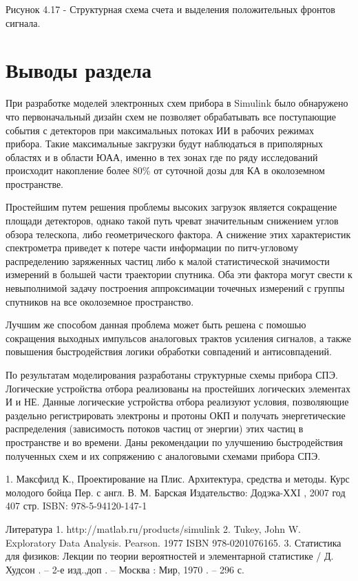 Рисунок 4.17 - Структурная схема счета и выделения положительных фронтов сигнала.


\section{Выводы раздела}
При разработке моделей электронных схем прибора в Simulink было обнаружено что первоначальный дизайн схем не позволяет обрабатывать все поступающие события с детекторов при максимальных потоках ИИ в рабочих режимах прибора. Такие максимальные закгрузки будут наблюдаться в приполярных областях и в области ЮАА, именно в тех зонах где по ряду исследований происходит накопление более 80\% от суточной дозы для КА в околоземном пространстве. 

Простейшим путем решения проблемы высоких загрузок является сокращение площади детекторов, однако такой путь чреват значительным снижением углов обзора телескопа, либо геометрического фактора. А снижение этих характеристик спектрометра приведет к потере части информации по питч-угловому распределению заряженных частиц либо к малой статистической значимости измерений в большей части траектории спутника. Оба эти фактора могут свести к невыполнимой задачу построения аппроксимации точечных измерений с группы спутников на все околоземное пространство.

Лучшим же способом данная проблема может быть решена с помошью сокращения выходных импульсов аналоговых трактов усиления сигналов, а также повышения быстродействия логики обработки совпадений и антисовпадений.
 
По результатам моделирования разработаны  структурные схемы прибора СПЭ.  Логические устройства отбора реализованы  на простейших логических элементах И и НЕ. Данные логические устройства отбора реализуют условия, позволяющие раздельно регистрировать электроны и протоны ОКП и получать энергетические распределения (зависимость потоков частиц от энергии) этих частиц в пространстве и во времени. Даны рекомендации по улучшению быстродействия полученных схем и их сопряжению с аналоговыми схемами прибора СПЭ.

1.	Максфилд К., Проектирование на Плис. Архитектура, средства и методы. Курс молодого бойца Пер. с англ. В. М. Барская Издательство: Додэка-ХХI , 2007 год 407 стр. ISBN: 978-5-94120-147-1


Литература
1.	http://matlab.ru/products/simulink
2.	Tukey, John W. Exploratory Data Analysis. Pearson. 1977 ISBN 978-0201076165.
3.	Статистика для физиков: Лекции по теории вероятностей и элементарной статистике / Д. Худсон . – 2-е изд.,доп . – Москва : Мир, 1970 . – 296 с.

